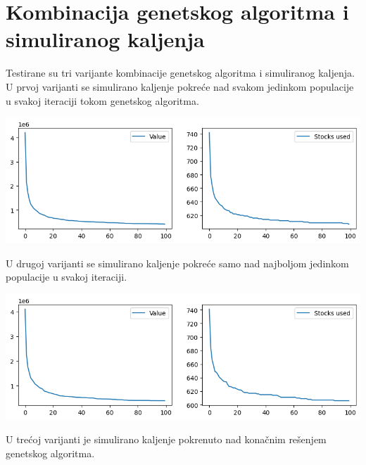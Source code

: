 \documentclass[12pt, a4paper]{article}
\begin{document}
\section{Kombinacija genetskog algoritma i simuliranog kaljenja}

Testirane su tri varijante kombinacije genetskog algoritma i simuliranog kaljenja. U prvoj varijanti se simulirano kaljenje pokreće nad svakom jedinkom populacije u svakoj iteraciji tokom genetskog algoritma. 

\vspace{0.5cm}
\begin{center}
  \hspace{1cm}
  \includegraphics[width=\linewidth]{img/ga_sa_1.png}
  \hspace{1cm} 
\end{center}
\vspace{0.5cm}

U drugoj varijanti se simulirano kaljenje pokreće samo nad najboljom jedinkom populacije u svakoj iteraciji.

\vspace{0.5cm}
\begin{center}
  \hspace{1cm}
  \includegraphics[width=\linewidth]{img/ga_sa_2.png}
  \hspace{1cm} 
\end{center}
\vspace{0.5cm}

U trećoj varijanti je simulirano kaljenje pokrenuto nad konačnim rešenjem genetskog algoritma.
\end{document}
